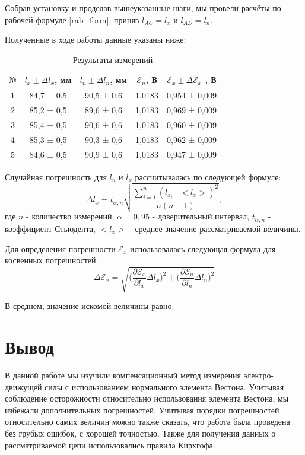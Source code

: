 \documentclass[a4paper,12pt]{article}
\begin{document}
Собрав установку и проделав вышеуказанные шаги, мы провели расчёты по рабочей формуле \eqref{rab_form}, приняв $l_{AC}=l_x$ и  $l_{AD}=l_n$.

Полученные в ходе работы данные указаны ниже:
\begin{table}[!h]
\begin{center}
	\begin{tabular}{|c|c|c|c|c|}
		\hline
		$№$&$l_x \pm\Delta l_x$, мм&$l_n \pm\Delta l_n$, мм&$\mathcal{E}_n$, В&$\mathcal{E}_x \pm\Delta \mathcal{E}_x$ , В
		\\ 
		\hline
		1	&84,7	 ± 0,5 & 	 90,5 ± 0,6 		&1,0183	& 0,954 ± 0,009
		\\
		\hline
		2	&85,2	 ± 0,5 &	 89,6 ± 0,6		&1,0183	& 0,969 ± 0,009
		\\
		\hline
		3	&85,4	 ± 0,5 &	 90,6 ± 0,6		&1,0183	& 0,960 ± 0,009
		\\
		\hline
		4	&85,3	 ± 0,5 & 	90,3 ± 0,6		&1,0183	& 0,962 ± 0,009
		\\
		\hline
		5	&84,6	 ± 0,5 & 	90,9 ± 0,6		&1,0183 	& 0,947 ± 0,009
		\\
		\hline	
	\end{tabular}
	\caption{Результаты измерений}
	\end{center}
\end{table}

Случайная погрешность для $l_n$ и $l_x$ рассчитывалась по следующей формуле:
$$\Delta l_x = t_{\alpha,n}\sqrt{\frac{\sum_{i=1}^n(l_{x_i} - <l_x>)^2}{n(n-1)}},$$
где $n$ - количество измерений, $\alpha = 0,95$ - доверительный интервал, $t_{\alpha,n}$ - коэффициент Стьюдента, $<l_x>$ - среднее значение рассматриваемой величины.

Для определения погрешности $\mathcal{E}_x$ использовалась следующая формула для косвенных погрешностей:
$$\Delta \mathcal{E}_x = \sqrt{\bigg(\frac{\partial\mathcal{E}_x}{\partial l_x}\Delta l_x\bigg)^2 + \bigg(\frac{\partial\mathcal{E}_n}{\partial l_n}\Delta l_n\bigg)^2}$$


В среднем, значение искомой величины равно:
\begin{center}
\end{center}

\section{Вывод}
В данной работе мы изучили компенсационный метод измерения электро-движущей силы с использованием нормального элемента Вестона. Учитывая соблюдение осторожности относительно использования элемента Вестона, мы избежали дополнительных погрешностей. Учитывая порядки погрешностей относительно самих величин можно также сказать, что работа была проведена без грубых ошибок, с хорошей точностью. Также для получения данных о рассматриваемой цепи использовались правила Кирхгофа.
\end{document}
